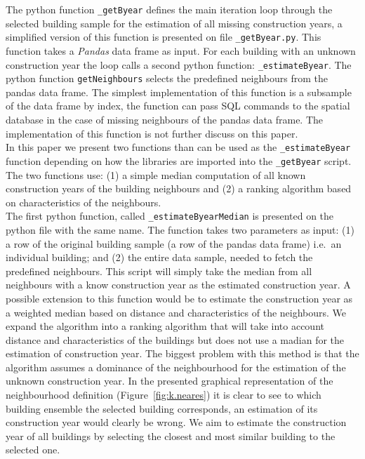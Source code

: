 The python function \verb|_getByear| defines the main iteration loop through
the selected building sample for the estimation of all missing construction
years, a simplified version of this function is presented on
file \verb|_getByear.py|. This function takes a \textit{Pandas} data frame
as input. For each building with an unknown construction year the loop
calls a second python function: \verb|_estimateByear|. The python function
\verb|getNeighbours| selects the predefined neighbours from the pandas data
frame. The simplest implementation of this function is a subsample of the data
frame by index, the function can pass SQL commands to the spatial database in
the case of missing neighbours of the pandas data frame. The implementation of
this function is not further discuss on this paper.\\

In this paper we present two functions than can be used as the
\verb|_estimateByear| function depending on how the libraries are imported into
the \verb|_getByear| script. The two functions use: (1) a simple median
computation of all known construction years of the building neighbours and
(2) a ranking algorithm based on characteristics of the neighbours.\\

The first python function, called \verb|_estimateByearMedian| is presented on
the python file with the same name. The function takes two parameters as
input: (1) a row of the original building sample (a row of the pandas data
frame) i.e.\ an individual building; and (2) the entire data sample, needed to
fetch the predefined neighbours. This script will simply take the median from
all neighbours with a know construction year as the estimated construction
year.
%
A possible extension to this function would be to estimate the construction
year as a weighted median based on distance and characteristics of the
neighbours.
%
We expand the algorithm into a ranking algorithm that will take into account
distance and characteristics of the buildings but does not use a madian for the
estimation of construction year.
%
The biggest problem with this method is that the algorithm assumes a dominance
of the neighbourhood for the estimation of the unknown construction year. In
the presented graphical representation of the neighbourhood definition
(Figure~\ref{fig:k.neares}) it is clear to see to which building ensemble the
selected building corresponds, an estimation of its construction year would
clearly be wrong. We aim to estimate the construction year of all buildings by
selecting the closest and most similar building to the selected one.
\\ 

